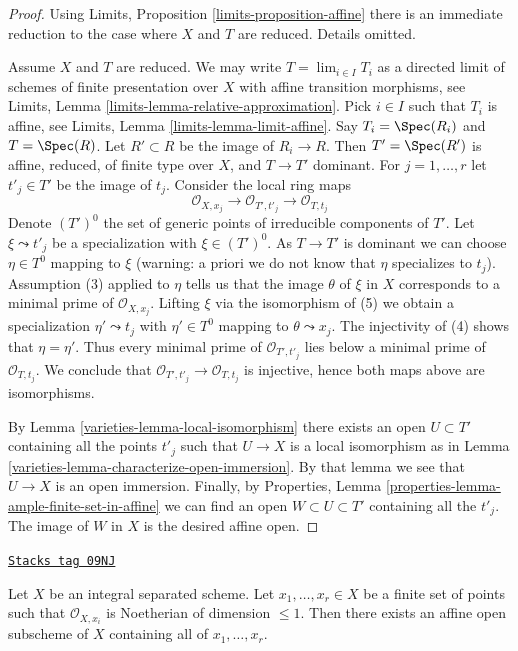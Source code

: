 \begin{proof}

Using Limits, Proposition \ref{limits-proposition-affine}
there is an immediate reduction to the case where $X$ and $T$ are reduced.
Details omitted.

\medskip\noindent
Assume $X$ and $T$ are reduced. We may write $T = \lim_{i \in I} T_i$
as a directed limit of schemes of finite presentation over $X$
with affine transition morphisms, see
Limits, Lemma \ref{limits-lemma-relative-approximation}.
Pick $i \in I$ such that $T_i$ is affine, see
Limits, Lemma \ref{limits-lemma-limit-affine}.
Say $T_i = \Spec(R_i)$ and $T = \Spec(R)$.
Let $R' \subset R$ be the image of $R_i \to R$.
Then $T' = \Spec(R')$ is affine, reduced, of finite type over $X$,
and $T \to T'$ dominant. For $j = 1, \ldots, r$ let $t'_j \in T'$
be the image of $t_j$. Consider the local ring maps
$$
\mathcal{O}_{X, x_j} \to
\mathcal{O}_{T', t'_j} \to
\mathcal{O}_{T, t_j}
$$
Denote $(T')^0$ the set of generic points of irreducible
components of $T'$. Let $\xi \leadsto t'_j$ be a specialization with
$\xi \in (T')^0$. As $T \to T'$ is dominant we can choose $\eta \in T^0$
mapping to $\xi$ (warning: a priori we do not know that $\eta$ specializes
to $t_j$). Assumption (3) applied to $\eta$ tells us that the image $\theta$
of $\xi$ in $X$ corresponds to a minimal prime of $\mathcal{O}_{X, x_j}$.
Lifting $\xi$ via the isomorphism of (5) we obtain a specialization
$\eta' \leadsto t_j$ with $\eta' \in T^0$ mapping to $\theta \leadsto x_j$.
The injectivity of (4) shows that $\eta = \eta'$. Thus
every minimal prime of $\mathcal{O}_{T', t'_j}$ lies below
a minimal prime of $\mathcal{O}_{T, t_j}$. We conclude that
$\mathcal{O}_{T', t'_j} \to \mathcal{O}_{T, t_j}$ is injective,
hence both maps above are isomorphisms.

\medskip\noindent
By Lemma \ref{varieties-lemma-local-isomorphism} there exists an open
$U \subset T'$ containing all the points $t'_j$ such that
$U \to X$ is a local isomorphism as in
Lemma \ref{varieties-lemma-characterize-open-immersion}.
By that lemma we see that $U \to X$ is an open immersion.
Finally, by
Properties, Lemma \ref{properties-lemma-ample-finite-set-in-affine}
we can find an open $W \subset U \subset T'$
containing all the $t'_j$. The image of $W$ in $X$ is the
desired affine open.
\end{proof}

\begin{lemma}
\label{varieties-lemma-finite-set-codim-1-points-in-affine}
\href{https://stacks.math.columbia.edu/tag/09NJ}{\texttt{Stacks tag 09NJ}}

Let $X$ be an integral separated scheme. Let $x_1, \ldots, x_r \in X$
be a finite set of points such that $\mathcal{O}_{X, x_i}$
is Noetherian of dimension $\leq 1$. Then there exists an affine
open subscheme of $X$ containing all of $x_1, \ldots, x_r$.
\end{lemma}

